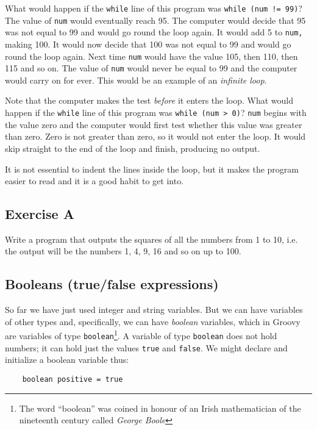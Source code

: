 What would happen if the \texttt{while} line of this program was
\texttt{while (num != 99)}?
The value of \texttt{num} would eventually reach 95.  The computer would
decide that 95 was not equal to 99 and would go round the loop again.
It would add 5 to \texttt{num,} making 100.
It would now decide that 100 was not equal to 99 and would go round the
loop again.  Next time \texttt{num} would have the value 105, then 110,
then 115 and so on.  The value of \texttt{num} would never be equal to 99
and the computer would carry on for ever.  This would be an example of
an \emph{infinite loop}.

Note that the computer makes the test \emph{before} it enters the loop.
What would happen if the \texttt{while} line of this program was
\texttt{while (num > 0)}?   \texttt{num} begins with the value zero and the computer would first
test whether this value was greater than zero.  Zero is not greater than
zero, so it would not enter the loop.  It would skip straight to the end
of the loop and finish, producing no output.

It is not essential to indent the lines inside the loop, but it makes the
program easier to read and it is a good habit to get into.

\subsection*{Exercise A}

Write a program that outputs the squares of all the numbers from 1 to
10, i.e. the output will be the numbers 1, 4, 9, 16 and so on up to 100.

\subsection{Booleans (true/false expressions)}

So far we have just used integer and string variables.  But we can
have variables of other types and, specifically, we can have
\emph{boolean} variables, which in Groovy are variables of type
\texttt{boolean}\footnote{The word ``boolean'' was coined in honour of an
Irish mathematician of the nineteenth century called \emph{George
  Boole}}.  A variable of type \texttt{boolean} does not hold numbers;
it can hold just the values \texttt{true} and \texttt{false}.  We
might declare and initialize a boolean variable thus:

\begin{Verbatim}
    boolean positive = true
\end{Verbatim}

